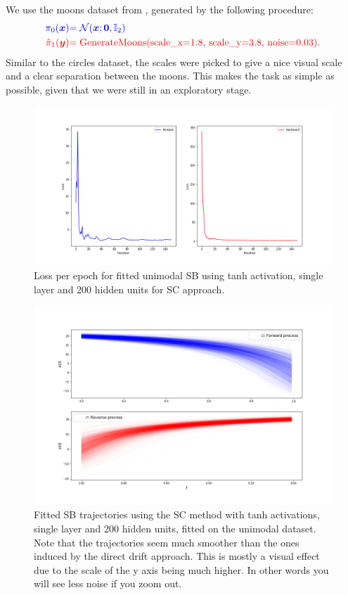 \documentclass[a4paper,12pt,twoside,openright]{report}
\theoremstyle{definition}
\begin{document}
We use the moons dataset from \cite{pedregosa2011scikit}, generated by the following procedure:
\begin{align*}
     \color{blue}{\pi_0({\bm{x}})} &\color{blue}{= {\mathcal{N}}({\bm{x}}; {\bm{0}},  \mathbb{I}_2)} \\
    \color{red}{\hat{\pi}_1({\bm{y}})} &\color{red}{= \text{GenerateMoons(scale\_x=1.8, scale\_y=3.8, noise=0.03)}}.
\end{align*}
Similar to the circles dataset, the scales were picked to give a nice visual scale and a clear separation between the moons. This makes the task as simple as possible, given that we were still in an exploratory stage.

\begin{figure}
    \centering
    \includegraphics[scale=0.4,trim={2.3cm 1cm 2.5cm 0cm}, clip]{images/Control/big_var_loss.png}
    \caption{Loss per epoch for fitted unimodal SB using tanh activation, single layer and 200 hidden units for SC approach.}
    \label{fig:epochsbigvarnn}
\end{figure}
\begin{figure}[t]
    \centering
    \includegraphics[scale=0.4,trim={2.3cm 1.9cm 2.5cm 2cm}, clip]{images/Control/big_var_marginals_best_tanh_trajectories.png}
    \caption{ Fitted SB trajectories using the SC method with tanh activations, single layer and 200 hidden units, fitted on the unimodal dataset. Note that the trajectories seem much smoother than the ones induced by the direct drift approach. This is mostly a visual effect due to the scale of the y axis being much higher. In other words you will see less noise if you zoom out.}
    \label{fig:trajectoriesbigvarnn}
\end{figure}
\end{document}
